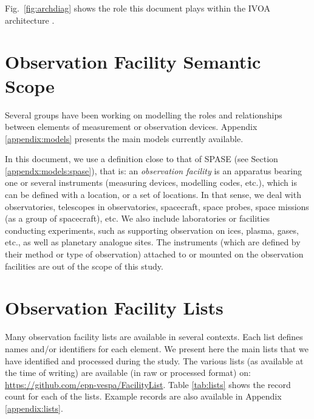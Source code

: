 \documentclass[11pt,a4paper]{ivoa}
\begin{document}
Fig.~\ref{fig:archdiag} shows the role this document plays within the
IVOA architecture \citep{2010ivoa.rept.1123A}.

\section{Observation Facility Semantic Scope}
\label{sec:scope}

Several groups have been working on modelling the roles and
relationships between elements of measurement or observation devices.
Appendix \ref{appendix:models} presents the main models currently
available.

In this document, we use a definition close to that of SPASE
(see Section \ref{appendx:models:spase}), that is: an
\emph{observation facility} is an apparatus bearing one or several
instruments (measuring devices, modelling codes, etc.), which is
can be defined with a location, or a set of locations. In that sense, we deal with observatories,
telescopes in observatories, spacecraft, space probes, space missions
(as a group of spacecraft), etc. We also include laboratories or
facilities conducting  experiments, such as supporting observation on
ices, plasma, gases, etc., as well as planetary analogue sites. The
instruments (which are defined by their method or type of observation)
attached to or mounted on the observation facilities are out of the scope
of this study.


\section{Observation Facility Lists}
Many observation facility lists are available in several contexts. Each list
defines names and/or identifiers for each element. We present here the main
lists that we have identified and processed during the study. The various
lists (as available at the time of writing) are available (in raw or
processed format) on: \url{https://github.com/epn-vespa/FacilityList}.
Table \ref{tab:lists} shows the record count for each of the lists.
Example records are also available in Appendix \ref{appendix:lists}.
\end{document}
